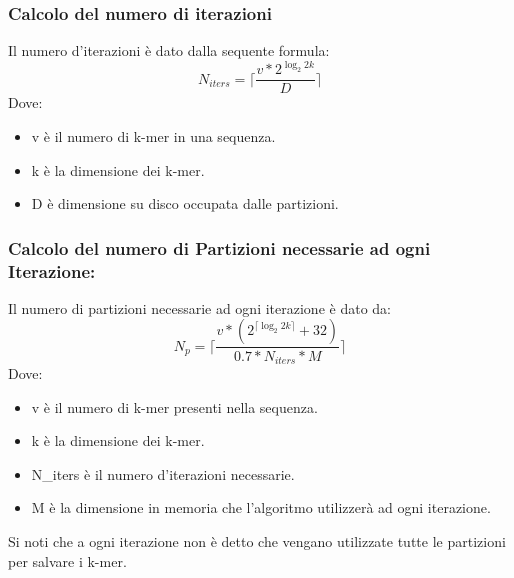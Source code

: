 \subsubsection{Calcolo del numero di iterazioni}%
Il numero d'iterazioni \`e dato dalla sequente formula:
\begin{equation*}
 N_{iters} = \lceil{\frac{v*2^{\log_2{2k}}}{D}}\rceil
\end{equation*}
Dove:
\begin{itemize}
 \item v \`e il numero di k-mer in una sequenza.
 \item k \`e la dimensione dei k-mer.
 \item D \`e dimensione su disco occupata dalle partizioni.
\end{itemize}
\subsubsection{Calcolo del numero di Partizioni necessarie ad ogni Iterazione:}%
Il numero di partizioni necessarie ad ogni iterazione \`e dato da:
\begin{equation*}
 N_{p} = \lceil{\frac{v*(2^{\lceil\log_2{2k}\rceil}+32)}{0.7*N_{iters}*M}}\rceil
\end{equation*}
Dove:
\begin{itemize}
 \item v \`e il numero di k-mer presenti nella sequenza.
 \item k \`e la dimensione dei k-mer.
 \item N\_{iters} \`e il numero d'iterazioni necessarie.
 \item M \`e la dimensione in memoria che l'algoritmo utilizzer\`a ad ogni iterazione.
\end{itemize}
Si noti che a ogni iterazione non \`e detto che vengano utilizzate tutte le partizioni per salvare i k-mer.
